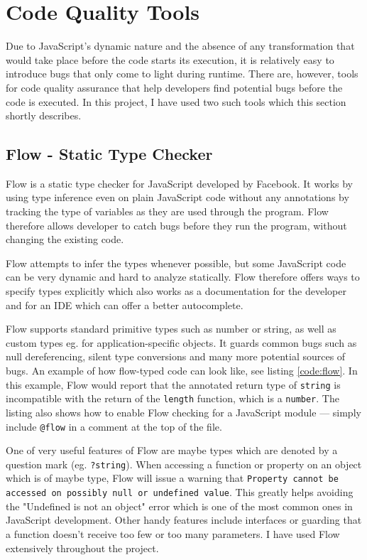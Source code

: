 \section{Code Quality Tools}

Due to JavaScript's dynamic nature and the absence of any transformation that would take place before the code starts its execution, it is relatively easy to introduce bugs that only come to light during runtime. There are, however, tools for code quality assurance that help developers find potential bugs before the code is executed. In this project, I have used two such tools which this section shortly describes.

\subsection{Flow - Static Type Checker}

Flow is a static type checker for JavaScript developed by Facebook. It works by using type inference even on plain JavaScript code without any annotations by tracking the type of variables as they are used through the program. Flow therefore allows developer to catch bugs before they run the program, without changing the existing code. 

Flow attempts to infer the types whenever possible, but some JavaScript code can be very dynamic and hard to analyze statically. Flow therefore offers ways to specify types explicitly which also works as a documentation for the developer and for an IDE which can offer a better autocomplete.

Flow supports standard primitive types such as number or string, as well as custom types eg. for application-specific objects. It guards common bugs such as null dereferencing, silent type conversions and many more potential sources of bugs. An example of how flow-typed code can look like, see listing \ref{code:flow}. In this example, Flow would report that the annotated return type of \texttt{string} is incompatible with the return of the \texttt{length} function, which is a \texttt{number}. The listing also shows how to enable Flow checking for a JavaScript module --- simply include \texttt{@flow} in a comment at the top of the file.




One of very useful features of Flow are maybe types which are denoted by a question mark (eg. \texttt{?string}). When accessing a function or property on an object which is of maybe type, Flow will issue a warning that \texttt{Property cannot be accessed on possibly null or undefined value}. This greatly helps avoiding the "Undefined is not an object" error which is one of the most common ones in JavaScript development. Other handy features include interfaces or guarding that a function doesn't receive too few or too many parameters. I have used Flow extensively throughout the project.

